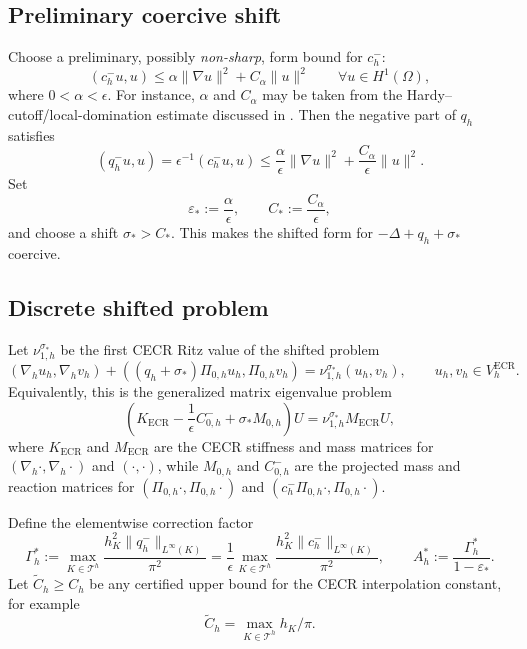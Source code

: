 \documentclass[11pt]{article}
\theoremstyle{plain}
\theoremstyle{definition}
\theoremstyle{remark}
\newcommand{\ECR}{\mathrm{ECR}}
\begin{document}
\subsection*{Preliminary coercive shift}

Choose a preliminary, possibly {\em non-sharp}, form bound for $c_h^-$:
\begin{equation}
\label{eq:appC-prelim-form-bound}
  (c_h^-u,u)
  \le
  \alpha\|\nabla u\|^2 + C_\alpha\|u\|^2
  \qquad \forall u\in H^1(\Omega),
\end{equation}
where $0<\alpha<\epsilon$.  For instance, $\alpha$ and $C_\alpha$ may
be taken from the Hardy--cutoff/local-domination estimate discussed in
.  Then the negative part of $q_h$ satisfies
\[
  (q_h^-u,u)
  =
  \epsilon^{-1}(c_h^-u,u)
  \le
  \frac{\alpha}{\epsilon}\|\nabla u\|^2
  + \frac{C_\alpha}{\epsilon}\|u\|^2.
\]
Set
\[
  \varepsilon_*:=\frac{\alpha}{\epsilon},
  \qquad
  C_*:=\frac{C_\alpha}{\epsilon},
\]
and choose a shift $\sigma_*>C_*$.  This makes the shifted form for
$-\Delta+q_h+\sigma_*$ coercive.

\subsection*{Discrete shifted problem}

Let $\nu_{1,h}^{\sigma_*}$ be the first CECR Ritz value of the shifted problem
\begin{equation}
\label{eq:evp-eta}
  (\nabla_h u_h,\nabla_h v_h)
  + ((q_h+\sigma_*)\Pi_{0,h}u_h,\Pi_{0,h}v_h)
  =
  \nu_{1,h}^{\sigma_*}(u_h,v_h),
  \qquad u_h,v_h\in V_h^{\ECR}.
\end{equation}
Equivalently, this is the generalized matrix eigenvalue problem
\begin{equation}
\label{eq:appC-matrix-shifted}
  \left(K_{\ECR}
  -\frac{1}{\epsilon}C^-_{0,h}
  +\sigma_* M_{0,h}\right)U
  =
  \nu_{1,h}^{\sigma_*}M_{\ECR}U,
\end{equation}
where $K_{\ECR}$ and $M_{\ECR}$ are the CECR stiffness and mass matrices for
$(\nabla_h\cdot,\nabla_h\cdot)$ and $(\cdot,\cdot)$, while
$M_{0,h}$ and $C^-_{0,h}$ are the projected mass and reaction matrices for
$(\Pi_{0,h}\cdot,\Pi_{0,h}\cdot)$ and
$(c_h^-\Pi_{0,h}\cdot,\Pi_{0,h}\cdot)$.

Define the elementwise correction factor
\begin{equation}
\label{eq:appC-gamma-A}
  \Gamma_h^*
  :=
  \max_{K\in\mathcal T^h}
  \frac{h_K^2\|q_h^-\|_{L^\infty(K)}}{\pi^2}
  =
  \frac{1}{\epsilon}
  \max_{K\in\mathcal T^h}
  \frac{h_K^2\|c_h^-\|_{L^\infty(K)}}{\pi^2},
  \qquad
  A_h^*
  :=
  \frac{\Gamma_h^*}{1-\varepsilon_*}.
\end{equation}
Let $\widetilde C_h\ge C_h$ be any certified upper bound for the CECR
interpolation constant, for example
\[
  \widetilde C_h=\max_{K\in\mathcal T^h}h_K/\pi.
\]
\end{document}
